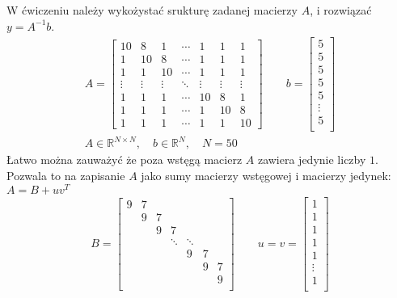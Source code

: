 \documentclass[11pt]{extarticle}
\begin{document}
	\subsection{}
	W ćwiczeniu należy wykożystać srukturę zadanej macierzy \(A\), i rozwiązać \(y = A^{-1}b\).
	\begin{align}
		A = \begin{bmatrix}
			10		& 8		& 1		& \dotsm	& 1		& 1		& 1 	\\
			1		& 10	& 8		& \dotsm	& 1		& 1		& 1 	\\
			1		& 1		& 10	& \dotsm	& 1		& 1		& 1 	\\
			\vdots	&\vdots	&\vdots	& \ddots	&\vdots	&\vdots	&\vdots	\\
			1		& 1		& 1		& \dotsm	& 10	& 8		& 1 	\\
			1		& 1		& 1		& \dotsm	& 1		& 10	& 8 	\\
			1		& 1		& 1		& \dotsm	& 1		& 1		& 10
		\end{bmatrix} \qquad
		b = \begin{bmatrix}
			5 \\
			5 \\
			5 \\
			5 \\
			5 \\
			\vdots \\
			5 \\
		\end{bmatrix} \\[12pt]
		A \in \mathbb{R}^{N \times N}, \quad
		b \in \mathbb{R}^{N}, \quad
		N = 50
	\end{align}
	Łatwo można zauważyć że poza wstęgą macierz \(A\) zawiera jedynie liczby \(1\).
	Pozwala to na zapisanie \(A\) jako sumy macierzy wstęgowej i macierzy jedynek: \(A = B + uv^T\)
	\begin{align}
		B = \begin{bmatrix}
					9		& 7	\\
			& 		9		& 7 \\
			&& 		9		& 7 \\
			&&&		\ddots	& \ddots \\
			&&&&	9		& 7 \\
			&&&&&	9		& 7 \\
			&&&&&&	9 \\
		\end{bmatrix} \qquad
		u = v = \begin{bmatrix}
			1 \\
			1 \\
			1 \\
			1 \\
			1 \\
			\vdots \\
			1 \\
		\end{bmatrix}
	\end{align}
\end{document}
